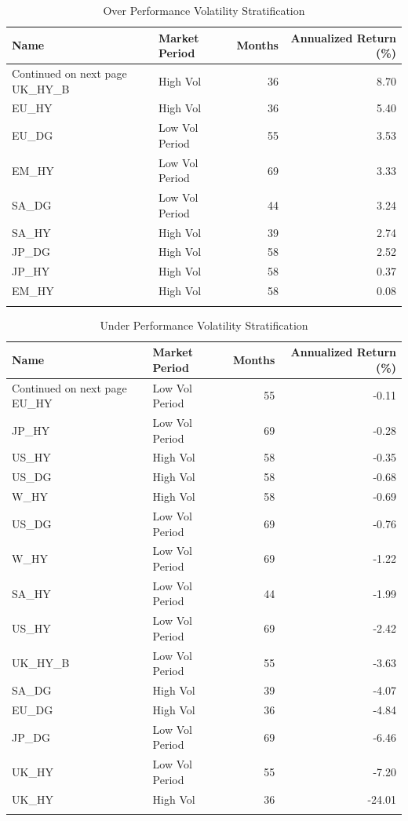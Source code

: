 \documentclass[11pt,preprint, authoryear]{elsarticle}
\numberwithin{equation}{section}
\numberwithin{figure}{section}
\numberwithin{table}{section}
\begin{document}
\begingroup\fontsize{12pt}{13pt}\selectfont
\begin{longtable}{llrr}
  \toprule
Name & Market Period & Months & Annualized Return (\%) \\ 
  \hline 
\endhead 
\hline 
{\footnotesize Continued on next page} 
\endfoot 
\endlastfoot 
 \midrule
UK\_HY\_B & High Vol &  36 & 8.70 \\ 
  EU\_HY & High Vol &  36 & 5.40 \\ 
  EU\_DG & Low Vol Period &  55 & 3.53 \\ 
  EM\_HY & Low Vol Period &  69 & 3.33 \\ 
  SA\_DG & Low Vol Period &  44 & 3.24 \\ 
  SA\_HY & High Vol &  39 & 2.74 \\ 
  JP\_DG & High Vol &  58 & 2.52 \\ 
  JP\_HY & High Vol &  58 & 0.37 \\ 
  EM\_HY & High Vol &  58 & 0.08 \\ 
   \bottomrule
\caption{Over Performance Volatility Stratification\label{tab2}} 
\end{longtable}
\endgroup
\begingroup\fontsize{12pt}{13pt}\selectfont
\begin{longtable}{llrr}
  \toprule
Name & Market Period & Months & Annualized Return (\%) \\ 
  \hline 
\endhead 
\hline 
{\footnotesize Continued on next page} 
\endfoot 
\endlastfoot 
 \midrule
EU\_HY & Low Vol Period &  55 & -0.11 \\ 
  JP\_HY & Low Vol Period &  69 & -0.28 \\ 
  US\_HY & High Vol &  58 & -0.35 \\ 
  US\_DG & High Vol &  58 & -0.68 \\ 
  W\_HY & High Vol &  58 & -0.69 \\ 
  US\_DG & Low Vol Period &  69 & -0.76 \\ 
  W\_HY & Low Vol Period &  69 & -1.22 \\ 
  SA\_HY & Low Vol Period &  44 & -1.99 \\ 
  US\_HY & Low Vol Period &  69 & -2.42 \\ 
  UK\_HY\_B & Low Vol Period &  55 & -3.63 \\ 
  SA\_DG & High Vol &  39 & -4.07 \\ 
  EU\_DG & High Vol &  36 & -4.84 \\ 
  JP\_DG & Low Vol Period &  69 & -6.46 \\ 
  UK\_HY & Low Vol Period &  55 & -7.20 \\ 
  UK\_HY & High Vol &  36 & -24.01 \\ 
   \bottomrule
\caption{Under Performance Volatility Stratification\label{tab3}} 
\end{longtable}
\endgroup
\end{document}
